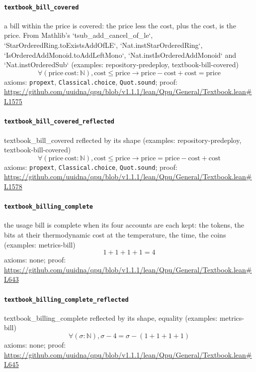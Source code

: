 \documentclass[11pt]{article}
\begin{document}
\paragraph{\texttt{textbook\_bill\_covered}}
a bill within the price is covered: the price less the cost, plus the cost, is the price. From Mathlib's `tsub\_add\_cancel\_of\_le`, `StarOrderedRing.toExistsAddOfLE`, `Nat.instStarOrderedRing`, `IsOrderedAddMonoid.toAddLeftMono`, `Nat.instIsOrderedAddMonoid` and `Nat.instOrderedSub` (examples: repository-predeploy, textbook-bill-covered)
\[ \forall (\mathrm{price}\ \mathrm{cost} : \mathbb{N}), \mathrm{cost} \le \mathrm{price} \to \mathrm{price} - \mathrm{cost} + \mathrm{cost} = \mathrm{price} \]
\noindent axioms: \texttt{propext}, \texttt{Classical.choice}, \texttt{Quot.sound}; proof: \url{https://github.com/uuidna/qpu/blob/v1.1.1/lean/Qpu/General/Textbook.lean\#L1575}

\paragraph{\texttt{textbook\_bill\_covered\_reflected}}
textbook\_bill\_covered reflected by its shape (examples: repository-predeploy, textbook-bill-covered)
\[ \forall (\mathrm{price}\ \mathrm{cost} : \mathbb{N}), \mathrm{cost} \le \mathrm{price} \to \mathrm{price} = \mathrm{price} - \mathrm{cost} + \mathrm{cost} \]
\noindent axioms: \texttt{propext}, \texttt{Classical.choice}, \texttt{Quot.sound}; proof: \url{https://github.com/uuidna/qpu/blob/v1.1.1/lean/Qpu/General/Textbook.lean\#L1578}

\paragraph{\texttt{textbook\_billing\_complete}}
the usage bill is complete when its four accounts are each kept: the tokens, the bits at their thermodynamic cost at the temperature, the time, the coins (examples: metrics-bill)
\[ 1 + 1 + 1 + 1 = 4 \]
\noindent axioms: none; proof: \url{https://github.com/uuidna/qpu/blob/v1.1.1/lean/Qpu/General/Textbook.lean\#L643}

\paragraph{\texttt{textbook\_billing\_complete\_reflected}}
textbook\_billing\_complete reflected by its shape, equality (examples: metrics-bill)
\[ \forall (\sigma : \mathbb{N}), \sigma - 4 = \sigma - (1 + 1 + 1 + 1) \]
\noindent axioms: none; proof: \url{https://github.com/uuidna/qpu/blob/v1.1.1/lean/Qpu/General/Textbook.lean\#L645}
\end{document}
